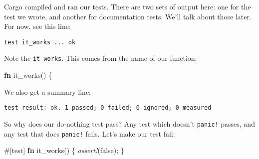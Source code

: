 \documentclass[a4paper,]{book}
\newenvironment{Shaded}{\begin{snugshade}}{\end{snugshade}}
\newcommand{\KeywordTok}[1]{\textcolor[rgb]{0.13,0.29,0.53}{\textbf{{#1}}}}
\newcommand{\ConstantTok}[1]{\textcolor[rgb]{0.00,0.00,0.00}{{#1}}}
\newcommand{\PreprocessorTok}[1]{\textcolor[rgb]{0.56,0.35,0.01}{\textit{{#1}}}}
\newcommand{\AttributeTok}[1]{\textcolor[rgb]{0.77,0.63,0.00}{{#1}}}
\newcommand{\NormalTok}[1]{{#1}}
\begin{document}
\begin{Shaded}
\end{Shaded}

Cargo compiled and ran our tests. There are two sets of output here: one
for the test we wrote, and another for documentation tests. We'll talk
about those later. For now, see this line:

\begin{verbatim}
test it_works ... ok
\end{verbatim}

Note the \texttt{it\_works}. This comes from the name of our function:

\begin{Shaded}
\begin{Highlighting}[]
\KeywordTok{fn} \NormalTok{it_works() \{}
\end{Highlighting}
\end{Shaded}

We also get a summary line:

\begin{verbatim}
test result: ok. 1 passed; 0 failed; 0 ignored; 0 measured
\end{verbatim}

So why does our do-nothing test pass? Any test which doesn't
\texttt{panic!} passes, and any test that does \texttt{panic!} fails.
Let's make our test fail:

\begin{Shaded}
\begin{Highlighting}[]
\AttributeTok{#[}\NormalTok{test}\AttributeTok{]}
\KeywordTok{fn} \NormalTok{it_works() \{}
    \PreprocessorTok{assert!}\NormalTok{(}\ConstantTok{false}\NormalTok{);}
\NormalTok{\}}
\end{Highlighting}
\end{Shaded}
\end{document}
